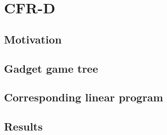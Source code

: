 \chapter{CFR-D}

\section{Motivation}

\section{Gadget game tree}

\section{Corresponding linear program}

\section{Results}

